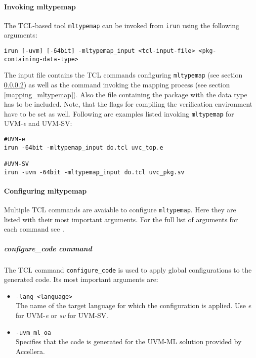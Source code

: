 \paragraph{Invoking mltypemap}
The TCL-based tool \lstinline$mltypemap$ can be invoked from \lstinline$irun$ using the following arguments:
{}
\begin{lstlisting}
irun [-uvm] [-64bit] -mltypemap_input <tcl-input-file> <pkg-containing-data-type>
\end{lstlisting} 
The input file contains the TCL commands configuring \lstinline$mltypemap$ (see section \ref{config_mltypemap}) as well as the command invoking the mapping process (see section \ref{mapping_mltypemap}). Also the file containing the package with the data type has to be included.
Note, that the flags for compiling the verification environment have to be set as well. Following are examples listed invoking \lstinline$mltypemap$ for UVM-\textit{e} and UVM-SV:
{}
\begin{lstlisting}
#UVM-e
irun -64bit -mltypemap_input do.tcl uvc_top.e

#UVM-SV
irun -uvm -64bit -mltypemap_input do.tcl uvc_pkg.sv
\end{lstlisting} 
\paragraph{Configuring mltypemap} \label{config_mltypemap}
Multiple TCL commands are avaiable to configure \lstinline$mltypemap$. Here they are listed with their most important arguments. For the full list of arguments for each command see \cite{cdnshelp}.
\subparagraph{configure\_code command}
The TCL command \lstinline$configure_code$ is used to apply global configurations to the generated code. Its most important arguments are:

\begin{itemize}
  \item{\lstinline$-lang <language>$}\\
  The name of the target language for which the configuration is applied. Use \emph{e} for UVM-\textit{e} or \emph{sv} for UVM-SV.
  \item{\lstinline$-uvm_ml_oa$}\\
  Specifies that the code is generated for the UVM-ML solution provided by Accellera.
\end{itemize}

